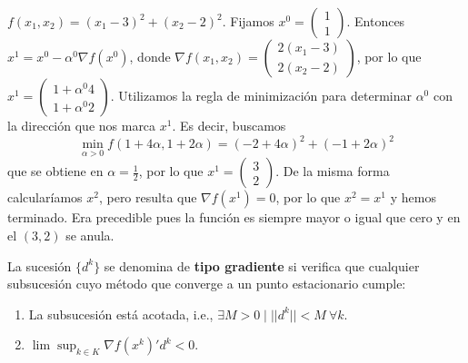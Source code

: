 \documentclass[MIOP.tex]{subfiles}
\begin{document}
\begin{ej}
$f(x_1,x_2)=(x_1-3)^2+(x_2-2)^2$. Fijamos $x^0=\begin{pmatrix}
1\\
1
\end{pmatrix}$. Entonces $x^1=x^0-\alpha^0\nabla f(x^0)$, donde $\nabla f(x_1,x_2)=\begin{pmatrix}
2(x_1-3)\\
2(x_2-2)
\end{pmatrix}$, por lo que $x^1=\begin{pmatrix}
1+\alpha^0 4\\
1+\alpha^0 2
\end{pmatrix}$. Utilizamos la regla de minimización para determinar $\alpha^0$ con la dirección que nos marca $x^1$. Es decir, buscamos
$$\min_{\alpha>0}f(1+4\alpha,1+2\alpha)=(-2+4\alpha)^2+(-1+2\alpha)^2$$
que se obtiene en $\alpha=\frac{1}{2}$, por lo que $x^1=\begin{pmatrix}
3\\
2
\end{pmatrix}$. De la misma forma calcularíamos $x^2$, pero resulta que $\nabla f(x^1)=0$, por lo que $x^2=x^1$ y hemos terminado. Era precedible pues la función es siempre mayor o igual que cero y en el $(3,2)$ se anula.
\end{ej}

\begin{defi}
La sucesión $\{d^k\}$ se denomina de \textbf{tipo gradiente} si verifica que cualquier subsucesión cuyo método que converge a un punto estacionario cumple: 
\begin{enumerate}
\item La subsucesión está acotada, i.e., $\exists M>0\mid ||d^k||<M\ \forall k$. 
\item $\lim\sup_{k\in K}\nabla f(x^k)'d^k<0$. \label{gradiente}
\end{enumerate}
\end{defi}
\end{document}
